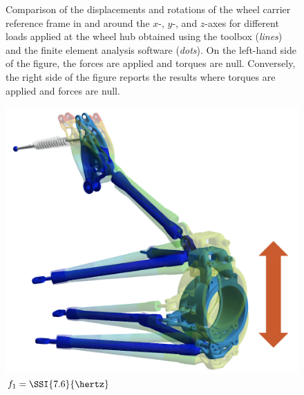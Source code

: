 \begin{figure}[htp!]
  \centering
  \small{}
  \caption{Comparison of the displacements and rotations of the wheel carrier reference frame in and around the $x$-, $y$-, and $z$-axes for different loads applied at the wheel hub obtained using the \TrussMe{} toolbox (\emph{lines}) and the \Ansys{} finite element analysis software (\emph{dots}). On the left-hand side of the figure, the forces are applied and torques are null. Conversely, the right side of the figure reports the results where torques are applied and forces are null.}
  \label{chap7:fig:suspension_static_results}
\end{figure}

\begin{figure}[!ht]
  \centering
  \begin{minipage}[c]{0.575\linewidth}
    \small{}
  \end{minipage}
  \begin{minipage}[c]{0.125\linewidth}
    \vspace{-2.5em}
    \begin{center}
      \includegraphics[width=1.0\linewidth]{./figures/chapter_7/mode1.png} \\ \small{$f_1 = \SSI{7.6}{\hertz}$} \\[0.8in]

\end{center}
\end{minipage}
\end{figure}
